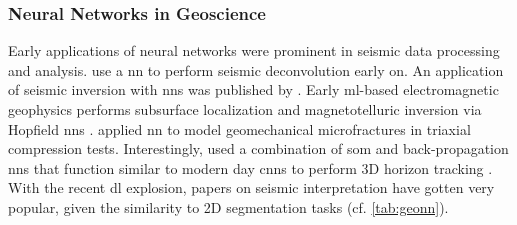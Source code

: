 \subsubsection{Neural Networks in Geoscience}
Early applications of neural networks were prominent in seismic data processing and analysis. \citet{Zhao1988-hu} use a \ac{nn} to perform seismic deconvolution early on. An application of seismic inversion with \acp{nn} was published by \citet{Roth1994-na}. Early \ac{ml}-based electromagnetic geophysics performs subsurface localization \citep{Poulton1992-ft} and magnetotelluric inversion via Hopfield \acp{nn} \citep{Zhang1997-yp}. \citet{Feng1998-ck} applied \ac{nn} to model geomechanical microfractures in triaxial compression tests. Interestingly, \citet{Legget1996-nk} used a combination of \acf{som} and back-propagation \acp{nn} that function similar to modern day \acfp{cnn} to perform 3D horizon tracking \citep{Leggett2003-vq}. With the recent \ac{dl} explosion, papers on seismic interpretation have gotten very popular, given the similarity to 2D segmentation tasks (cf. \cref{tab:geonn}).

